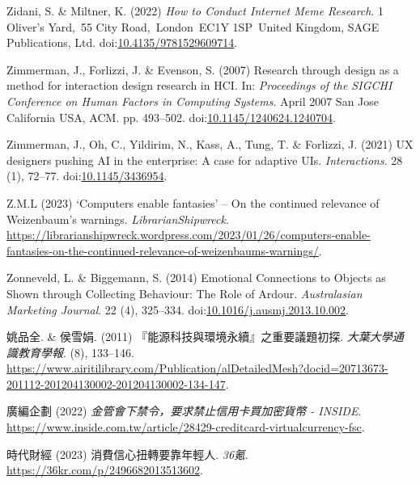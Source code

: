 \documentclass[
  letterpaper,
  DIV=11,
  numbers=noendperiod]{scrartcl}
\newlength{\cslhangindent}
\newenvironment{CSLReferences}[2] %
 {\begin{list}{}{%
  \setlength{\itemindent}{0pt}
  \setlength{\leftmargin}{0pt}
  \setlength{\parsep}{0pt}
  \ifodd #1
   \setlength{\leftmargin}{\cslhangindent}
   \setlength{\itemindent}{-1\cslhangindent}
  \fi
  \setlength{\itemsep}{#2\baselineskip}}}
 {\end{list}}
\begin{document}
\begin{CSLReferences}{0}{1}
Zidani, S. \& Miltner, K. (2022) \emph{How to {Conduct Internet Meme
Research}}. 1 Oliver's Yard,~55 City Road,~London~EC1Y 1SP~United
Kingdom, SAGE Publications, Ltd.
doi:\href{https://doi.org/10.4135/9781529609714}{10.4135/9781529609714}.

Zimmerman, J., Forlizzi, J. \& Evenson, S. (2007) Research through
design as a method for interaction design research in {HCI}. In:
\emph{Proceedings of the {SIGCHI Conference} on {Human Factors} in
{Computing Systems}}. April 2007 San Jose California USA, ACM. pp.
493--502.
doi:\href{https://doi.org/10.1145/1240624.1240704}{10.1145/1240624.1240704}.

Zimmerman, J., Oh, C., Yildirim, N., Kass, A., Tung, T. \& Forlizzi, J.
(2021) {UX} designers pushing {AI} in the enterprise: A case for
adaptive {UIs}. \emph{Interactions}. 28 (1), 72--77.
doi:\href{https://doi.org/10.1145/3436954}{10.1145/3436954}.

Z.M.L (2023) {`{Computers} enable fantasies'} -- {On} the continued
relevance of {Weizenbaum}'s warnings. \emph{LibrarianShipwreck}.
\url{https://librarianshipwreck.wordpress.com/2023/01/26/computers-enable-fantasies-on-the-continued-relevance-of-weizenbaums-warnings/}.

Zonneveld, L. \& Biggemann, S. (2014) Emotional {Connections} to
{Objects} as {Shown} through {Collecting Behaviour}: {The Role} of
{Ardour}. \emph{Australasian Marketing Journal}. 22 (4), 325--334.
doi:\href{https://doi.org/10.1016/j.ausmj.2013.10.002}{10.1016/j.ausmj.2013.10.002}.

姚品全. \& 侯雪娟. (2011) {『能源科技與環境永續』之重要議題初探}.
\emph{大葉大學通識教育學報}. (8), 133--146.
\url{https://www.airitilibrary.com/Publication/alDetailedMesh?docid=20713673-201112-201204130002-201204130002-134-147}.

廣編企劃 (2022) \emph{金管會下禁令，要求禁止信用卡買加密貨幣 -
{INSIDE}}.
\url{https://www.inside.com.tw/article/28429-creditcard-virtualcurrency-fsc}.

時代財經 (2023) 消費信心扭轉要靠年輕人. \emph{36氪}.
\url{https://36kr.com/p/2496682013513602}.


\end{CSLReferences}
\end{document}
